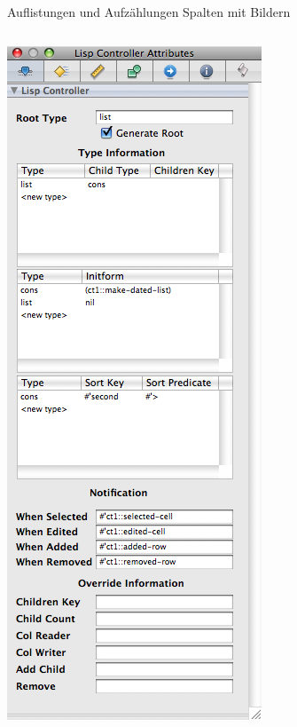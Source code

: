 \documentclass[utf8]{beamer}
\begin{document}
\begin{frame}{Auflistungen und Aufz\"ahlungen}
	Spalten mit Bildern
	\begin{columns}[T]

	\includegraphics[width=\textwidth]{Controller10}

\end{columns}
\end{frame}
\end{document}
